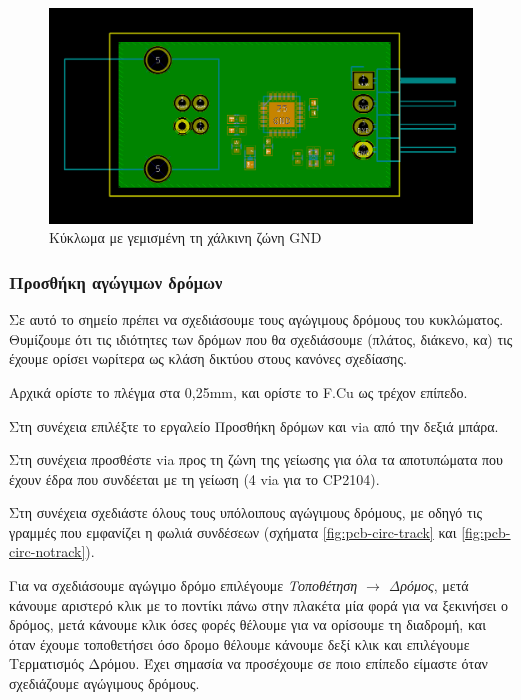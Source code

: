 \documentclass[a4paper]{article}
\begin{document}
\begin{figure}
  \begin{center}
    \includegraphics[width=.9\textwidth]{img/pcb-circ-zone.png}
    \caption{Κύκλωμα με γεμισμένη τη χάλκινη ζώνη GND}
    \label{fig:pcb-circ-zone}
  \end{center}
\end{figure}

\subsubsection{Προσθήκη αγώγιμων δρόμων}

Σε αυτό το σημείο πρέπει να σχεδιάσουμε τους αγώγιμους δρόμους του κυκλώματος. Θυμίζουμε ότι τις ιδιότητες των δρόμων που θα σχεδιάσουμε (πλάτος, διάκενο, κα) τις έχουμε ορίσει νωρίτερα ως κλάση δικτύου στους κανόνες σχεδίασης.

Αρχικά ορίστε το πλέγμα στα 0,25mm, και ορίστε το F.Cu ως τρέχον επίπεδο.

Στη συνέχεια επιλέξτε το εργαλείο Προσθήκη δρόμων και via από την δεξιά μπάρα.

Στη συνέχεια προσθέστε via προς τη ζώνη της γείωσης για όλα τα αποτυπώματα που έχουν έδρα που συνδέεται με τη γείωση (4 via για το CP2104). 

Στη συνέχεια σχεδιάστε όλους τους υπόλοιπους αγώγιμους δρόμους, με οδηγό τις γραμμές που εμφανίζει η φωλιά συνδέσεων (σχήματα \ref{fig:pcb-circ-track} και \ref{fig:pcb-circ-notrack}).  

Για να σχεδιάσουμε αγώγιμο δρόμο επιλέγουμε \textit{Τοποθέτηση $\rightarrow$ Δρόμος}, μετά κάνουμε αριστερό κλικ με το ποντίκι πάνω στην πλακέτα μία φορά για να ξεκινήσει ο δρόμος, μετά κάνουμε κλικ όσες φορές θέλουμε για να ορίσουμε τη διαδρομή, και όταν έχουμε τοποθετήσει όσο δρομο θέλουμε κάνουμε δεξί κλικ και επιλέγουμε Τερματισμός Δρόμου. Έχει σημασία να προσέχουμε σε ποιο επίπεδο είμαστε όταν σχεδιάζουμε αγώγιμους δρόμους. 
\end{document}

